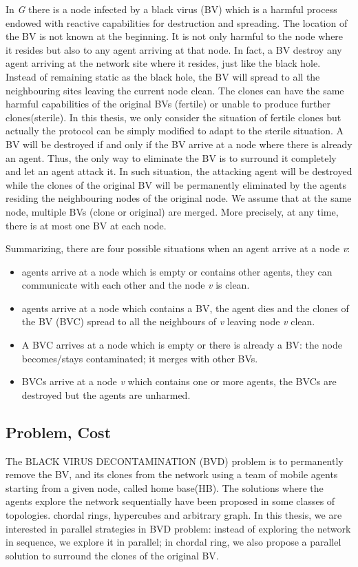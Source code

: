 In {\em G} there is a node infected by a black virus (BV) which is a harmful process endowed with reactive capabilities for destruction and spreading. The location of the BV is not known at the beginning. It is not only harmful to the node where it resides but also to any agent arriving at that node. In fact, a BV destroy any agent arriving at the network site where it resides, just like the black hole. Instead of remaining static as the black hole, the BV will spread to all the neighbouring sites leaving the current node clean. The clones can have the same harmful capabilities of the original BVs (fertile) or unable to produce further clones(sterile). In this thesis, we only consider the situation of fertile clones but actually the protocol can be simply modified to adapt to the sterile situation. A BV will be destroyed if and only if the BV arrive at a node where there is already an agent. Thus, the only way to eliminate the BV is to surround it completely and let an agent attack it. In such situation, the attacking agent will be destroyed while the clones of the original BV will be permanently eliminated by the agents residing the neighbouring nodes of the original node. We assume that at the same node, multiple BVs (clone or original) are merged. More precisely, at any time, there is at most one BV at each node. 

Summarizing, there are four possible situations when an agent arrive at a node {\em v}:
\begin{itemize}
\item agents arrive at a node which is empty or contains other agents, they can communicate with each other and the node {\em v} is clean.
\item agents arrive at a node which contains a BV, the agent dies and the clones of the BV (BVC) spread to all the neighbours of {\em v} leaving node {\em v} clean.
\item A BVC arrives at a node which is empty or there is already a BV: the node becomes/stays contaminated; it merges with other BVs.
\item BVCs arrive at a node {\em v} which contains one or more agents, the BVCs are destroyed but the agents are unharmed.
\end{itemize}

\subsection{Problem, Cost}
The BLACK VIRUS DECONTAMINATION (BVD) problem is to permanently remove the BV, and its clones from the network using a team of mobile agents starting from a given node, called home base(HB). The solutions where the agents explore the network sequentially have been proposed in some classes of topologies. chordal rings, hypercubes and arbitrary graph. In this thesis, we are interested in parallel strategies in BVD problem: instead of exploring the network in sequence, we explore it in parallel; in chordal ring, we also propose a parallel solution to surround the clones of the original BV.

